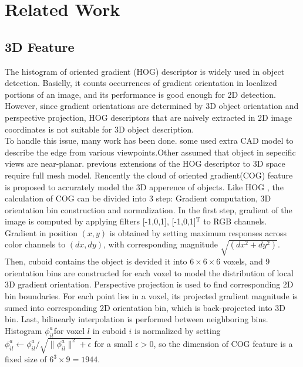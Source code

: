 \documentclass[english]{ccdconf}
\begin{document}
\section{Related Work}

\subsection{3D Feature}
\label{3D Feature}
The histogram of oriented gradient (HOG) descriptor \cite{dalal2005histograms} is widely used in object detection. Basiclly, it counts occurrences of gradient orientation in localized portions of an image, and its performance is good enough for 2D detection.  However, since gradient orientations are determined by 3D object orientation and perspective projection, HOG descriptors that are naively extracted in 2D image coordinates is not suitable for 3D object description.\\
To handle this issue,  many work has been done. some used extra CAD model to describe the edge from various viewpoints\cite{aubry2014seeing}.Other assumed that object in sepecific views are near-planar\cite{fidler20123d}. previous extensions of the HOG descriptor  to 3D space require full mesh model\cite{buch20093d}. Rencently the cloud of oriented gradient(COG) feature\cite{ren2016three} is proposed to accurately model the 3D apperence of objects. Like HOG , the calculation of COG can be divided into 3 step: Gradient computation, 3D orientation bin construction and normalization. In the first step, gradient of the image is computed by applying filters [-1,0,1], [-1,0,1]$^\mathrm{T}$ to RGB channels. Gradient in position $(x,y)$ is obtained by setting  maximum responses across
color channels to $(dx,dy)$, with corresponding magnitude $\sqrt{(dx^2+dy^2)}$.
Then, cuboid contains the object is devided it into $6\times6\times6$ voxels, and 9 orientation bins are constructed for each voxel to model the distribution of local 3D gradient orientation. Perspective projection is used to find corresponding 2D bin boundaries. For each point lies in a voxel, its projected gradient magnitude is sumed into corresponding 2D orientation bin, which is back-projected into 3D bin. Last, bilinearly interpolation is performed between neighboring bins.
 Histogram $\phi_{il}^a$for voxel $l$ in cuboid $i$ is normalized by setting $\phi_{il}^a \leftarrow \phi_{il}^a / \sqrt{\|\phi_{il}^a \|^2+ \epsilon}$ for a small $\epsilon>0$, so the dimension of COG feature is a fixed size of $6^3\times9=1944$.\\
\end{document}
